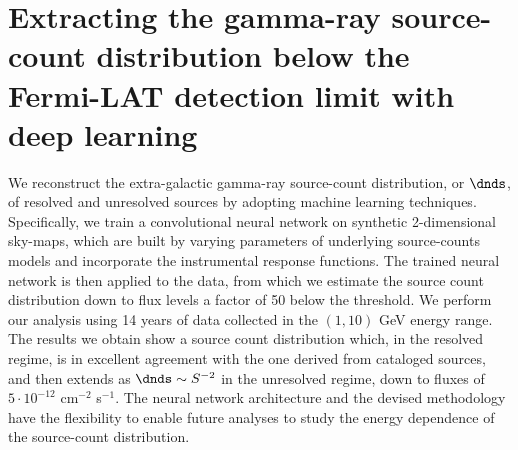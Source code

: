 %
\chapter{Extracting the gamma-ray source-count distribution below the Fermi-LAT detection limit with deep learning}
\label{ch:dnds}

We reconstruct the extra-galactic gamma-ray source-count distribution, or $\dnds$, of resolved and unresolved sources by adopting machine learning techniques. Specifically, we train a convolutional neural network on synthetic 2-dimensional sky-maps, which are built by varying parameters of underlying source-counts models and incorporate  the  \fermi instrumental response functions. The trained neural network is then applied to the \fermi data, from which we estimate the source count distribution down to flux levels a factor of 50 below the \fermi threshold.
We perform our analysis using 14 years of data collected in the $(1,10)$ GeV energy range. The results we obtain show a source count distribution which, in the resolved regime, is in excellent agreement with the one derived from cataloged sources, and then extends as $\dnds \sim S^{-2}$ in the unresolved regime, down to fluxes of $5 \cdot 10^{-12}$ cm$^{-2}$ s$^{-1}$. The neural network architecture and the devised methodology have the flexibility to enable future analyses to study the energy dependence of the source-count distribution.








\begin{subappendices}

\end{subappendices}
